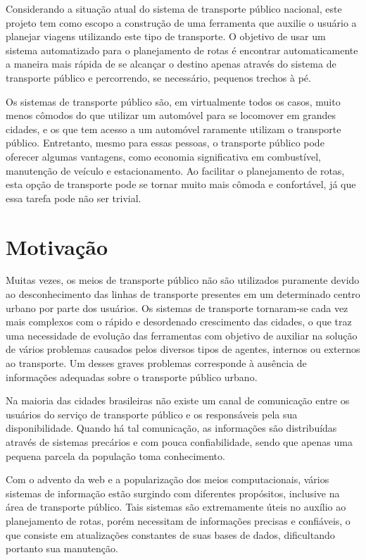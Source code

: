 Considerando a situação atual do sistema de transporte público nacional, este projeto tem como escopo a construção de uma ferramenta que auxilie o usuário a planejar viagens utilizando este tipo de transporte.
O objetivo de usar um sistema automatizado para o planejamento de rotas é encontrar automaticamente a maneira mais rápida de se alcançar o destino apenas através do sistema de transporte público e percorrendo, se necessário, pequenos trechos à pé.

Os sistemas de transporte público são, em virtualmente todos os casos, muito menos cômodos do que utilizar um automóvel para se locomover em grandes cidades, e os que tem acesso a um automóvel raramente utilizam o transporte público. Entretanto, mesmo para essas pessoas, o transporte público pode oferecer algumas vantagens, como economia significativa em combustível, manutenção de veículo e estacionamento. Ao facilitar o planejamento de rotas, esta opção de transporte pode se tornar muito mais cômoda e confortável, já que essa tarefa pode não ser trivial.

\section{Motivação}

Muitas vezes, os meios de transporte público não são utilizados puramente devido ao desconhecimento das linhas de transporte presentes em um determinado centro urbano por parte dos usuários.
Os sistemas de transporte tornaram-se cada vez mais complexos com o rápido e desordenado crescimento das cidades, o que traz uma necessidade de evolução das
ferramentas com objetivo de auxiliar na solução de vários problemas causados pelos diversos tipos de agentes, internos ou externos ao transporte. 
Um desses graves problemas corresponde à ausência de informações adequadas sobre o transporte público urbano.

Na maioria das cidades brasileiras não existe um canal de comunicação entre os usuários do serviço de transporte público e os responsáveis pela sua disponibilidade. Quando há tal comunicação, as informações são distribuídas através de sistemas precários e com pouca confiabilidade, sendo que apenas uma pequena parcela da população toma conhecimento.

Com o advento da web e a popularização dos meios computacionais, vários sistemas de informação estão surgindo com diferentes propósitos, inclusive na área de transporte público. Tais sistemas são extremamente úteis no auxílio ao planejamento de rotas, porém necessitam de informações precisas e confiáveis, o que consiste em atualizações constantes de suas bases de dados, dificultando portanto sua manutenção.

